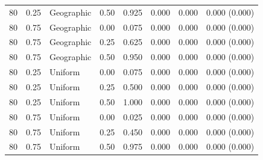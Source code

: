 \begin{center}
\begin{longtable}{rrlrrrrr}
80 & 0.25 & Geographic & 0.50 & 0.925 & 0.000 & 0.000 & 0.000 (0.000) \\
80 & 0.75 & Geographic & 0.00 & 0.075 & 0.000 & 0.000 & 0.000 (0.000) \\
80 & 0.75 & Geographic & 0.25 & 0.625 & 0.000 & 0.000 & 0.000 (0.000) \\
80 & 0.75 & Geographic & 0.50 & 0.950 & 0.000 & 0.000 & 0.000 (0.000) \\
80 & 0.25 & Uniform & 0.00 & 0.075 & 0.000 & 0.000 & 0.000 (0.000) \\
80 & 0.25 & Uniform & 0.25 & 0.500 & 0.000 & 0.000 & 0.000 (0.000) \\
80 & 0.25 & Uniform & 0.50 & 1.000 & 0.000 & 0.000 & 0.000 (0.000) \\
80 & 0.75 & Uniform & 0.00 & 0.025 & 0.000 & 0.000 & 0.000 (0.000) \\
80 & 0.75 & Uniform & 0.25 & 0.450 & 0.000 & 0.000 & 0.000 (0.000) \\
80 & 0.75 & Uniform & 0.50 & 0.975 & 0.000 & 0.000 & 0.000 (0.000) \\
\bottomrule\end{longtable}\end{center}
